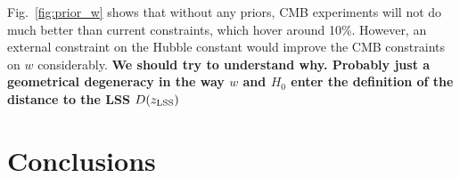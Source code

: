 \documentclass[aps,prd,reprint,superscriptaddress]{revtex4-1}
\newcommand{\reffig}[1]{Fig.~\ref{fig:#1}}
\begin{document}
\reffig{prior_w} shows that without any priors, CMB experiments will not do much better than current constraints, which hover around 10\%. However, an external constraint on the Hubble constant would improve the CMB constraints on $w$ considerably. {\bf We should try to understand why. Probably just a geometrical degeneracy in the way $w$ and $H_{0}$ enter the definition of the distance to the LSS $D(z_{\rm LSS})$}

\section{Conclusions  \label{sec:conclusions}}



%

\end{document}
